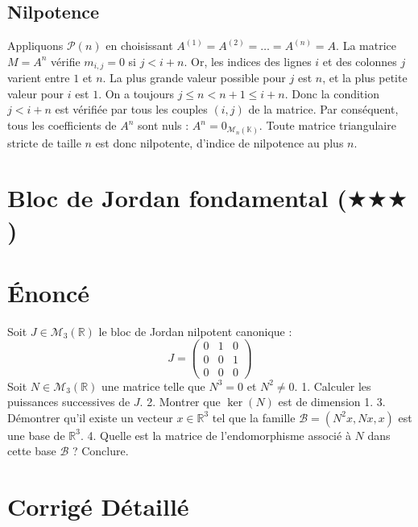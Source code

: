 \documentclass[11pt,a4paper]{article}
\begin{document}
\subsection{Nilpotence}
Appliquons $\mathcal{P}(n)$ en choisissant $A^{(1)} = A^{(2)} = \dots = A^{(n)} = A$.
La matrice $M = A^n$ vérifie $m_{i,j} = 0$ si $j < i + n$.
Or, les indices des lignes $i$ et des colonnes $j$ varient entre $1$ et $n$.
La plus grande valeur possible pour $j$ est $n$, et la plus petite valeur pour $i$ est $1$.
On a toujours $j \le n < n + 1 \le i + n$.
Donc la condition $j < i + n$ est vérifiée par tous les couples $(i,j)$ de la matrice.
Par conséquent, tous les coefficients de $A^n$ sont nuls : $A^n = 0_{\mathcal{M}_n(\mathbb{K})}$.
Toute matrice triangulaire stricte de taille $n$ est donc nilpotente, d'indice de nilpotence au plus $n$.


\section{Bloc de Jordan fondamental ($\bigstar$$\bigstar$$\bigstar$)}

\section{Énoncé}
Soit $J \in \mathcal{M}_3(\mathbb{R})$ le bloc de Jordan nilpotent canonique :
$$J = \begin{pmatrix} 0 & 1 & 0 \\ 0 & 0 & 1 \\ 0 & 0 & 0 \end{pmatrix}$$
Soit $N \in \mathcal{M}_3(\mathbb{R})$ une matrice telle que $N^3 = 0$ et $N^2 \neq 0$.
1. Calculer les puissances successives de $J$.
2. Montrer que $\ker(N)$ est de dimension 1.
3. Démontrer qu'il existe un vecteur $x \in \mathbb{R}^3$ tel que la famille $\mathcal{B} = (N^2 x, Nx, x)$ est une base de $\mathbb{R}^3$.
4. Quelle est la matrice de l'endomorphisme associé à $N$ dans cette base $\mathcal{B}$ ? Conclure.

\section{Corrigé Détaillé}
\end{document}
